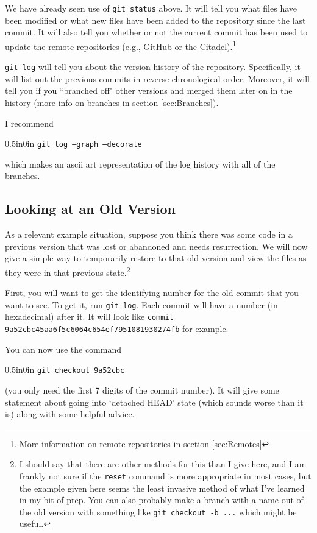 \documentclass[11pt]{article}
\newcommand{\code}[1]{\begin{adjustwidth}{0.5in}{0in}
    \texttt{#1}
    \end{adjustwidth}}
\begin{document}
We have already seen use of \texttt{git status} above.  It will tell you what files have been modified or what new files have been added to the repository since the last commit.  It will also tell you whether or not the current commit has been used to update the remote repositories (e.g., GitHub or the Citadel).\footnote{More information on remote repositories in section \ref{sec:Remotes}}

\texttt{git log} will tell you about the version history of the repository.  Specifically, it will list out the previous commits in reverse chronological order.  Moreover, it will tell you if you ``branched off" other versions and merged them later on in the history (more info on branches in section \ref{sec:Branches}).  

I recommend 
\code{git log --graph --decorate} 
which makes an ascii art representation of the log history with all of the branches.
 
 \subsection{Looking at an Old Version}
 
 As a relevant example situation, suppose you think there was some code in a previous version that was lost or abandoned and needs resurrection.  We will now give a simple way to temporarily restore to that old version and view the files as they were in that previous state.\footnote{I should say that there are other methods for this than I give here, and I am frankly not sure if the \texttt{reset} command is more appropriate in most cases, but the example given here seems the least invasive method of what I've learned in my bit of prep.  You can also probably make a branch with a name out of the old version with something like \texttt{git checkout -b ...} which might be useful.}

First, you will want to get the identifying number for the old commit that you want to see.  To get it, run \texttt{git log}.  Each commit will have a number (in hexadecimal) after it.  It will look like \texttt{commit 9a52cbc45aa6f5c6064c654ef7951081930274fb} for example.  

You can now use the command

\code{git checkout 9a52cbc}

(you only need the first 7 digits of the commit number).  It will give some statement about going into `detached HEAD' state (which sounds worse than it is) along with some helpful advice.
\end{document}
